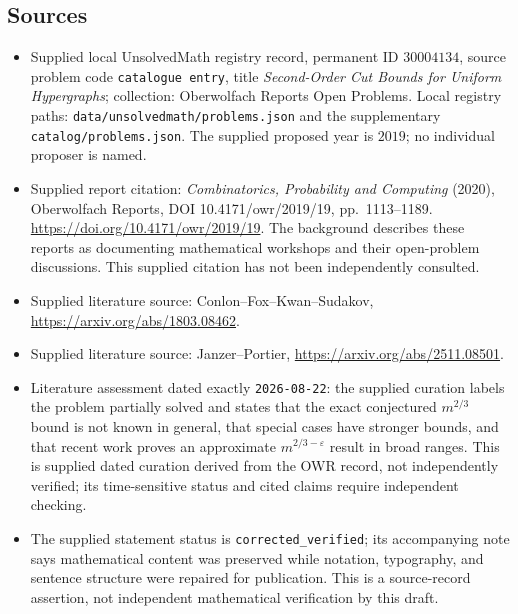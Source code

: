 \documentclass[11pt]{article}
\begin{document}
\subsection{Sources}
\begin{itemize}
\item Supplied local UnsolvedMath registry record, permanent ID \(30004134\), source problem code \texttt{catalogue entry}, title \emph{Second-Order Cut Bounds for Uniform Hypergraphs}; collection: Oberwolfach Reports Open Problems. Local registry paths: \texttt{data/unsolvedmath/problems.json} and the supplementary \texttt{catalog/problems.json}. The supplied proposed year is \(2019\); no individual proposer is named.
\item Supplied report citation: \emph{Combinatorics, Probability and Computing} (2020), Oberwolfach Reports, DOI 10.4171/owr/2019/19, pp.\ 1113--1189. \url{https://doi.org/10.4171/owr/2019/19}. The background describes these reports as documenting mathematical workshops and their open-problem discussions. This supplied citation has not been independently consulted.
\item Supplied literature source: Conlon--Fox--Kwan--Sudakov, \url{https://arxiv.org/abs/1803.08462}.
\item Supplied literature source: Janzer--Portier, \url{https://arxiv.org/abs/2511.08501}.
\item Literature assessment dated exactly \texttt{2026-08-22}: the supplied curation labels the problem partially solved and states that the exact conjectured \(m^{2/3}\) bound is not known in general, that special cases have stronger bounds, and that recent work proves an approximate \(m^{2/3-\varepsilon}\) result in broad ranges. This is supplied dated curation derived from the OWR record, not independently verified; its time-sensitive status and cited claims require independent checking.
\item The supplied statement status is \texttt{corrected\_verified}; its accompanying note says mathematical content was preserved while notation, typography, and sentence structure were repaired for publication. This is a source-record assertion, not independent mathematical verification by this draft.
\end{itemize}
\end{document}
